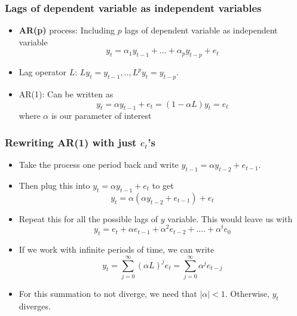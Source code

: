 \documentclass[aspectratio=169]{beamer}
\begin{document}
\begin{frame}
\frametitle{Lags of dependent variable as independent variables}
\begin{itemize}
\item \textbf{AR(p)} process: Including  $p$ lags of dependent variable as independent variable
\[
y_t = \alpha_1y_{t-1}+...+\alpha_p y_{t-p}+e_t
\]
\item Lag operator $L$:  $Ly_t= y_{t-1},..,L^p y_t = y_{t-p}$. 
\item AR(1): Can be written as
\[
y_t = \alpha y_{t-1}+e_t = (1-\alpha L)y_t = e_t
\]
where $\alpha$ is our parameter of interest
\end{itemize}
\end{frame}

\begin{frame}
\frametitle{Rewriting AR(1) with just $e_t$'s}
\begin{itemize}
\item Take the process one period back and write $y_{t-1}=\alpha y_{t-2}+e_{t-1}$. 
\item Then plug this into $y_t=\alpha y_{t-1} +e_t$ to get
\[
y_{t}=\alpha(\alpha y_{t-2}+e_{t-1})+e_t
\]
\item Repeat this for all the possible lags of $y$ variable. This would leave us with
\[
y_t = e_t + \alpha e_{t-1} + \alpha^2 e_{t-2}+ .... + \alpha ^t e_0
\] 
\item If we work with infinite periods of time, we can write
\[
y_t = \sum_{j=0}^\infty (\alpha L)^j e_t= \sum_{j=0}^\infty \alpha^j e_{t-j}
\]
\item For this summation to not diverge, we need that $|\alpha|<1$. Otherwise, $y_t$ diverges.
\end{itemize}
\end{frame}
\end{document}
